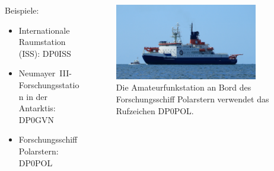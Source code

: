 \begin{frame}
\begin{columns}
    \begin{column}{0.48\textwidth}
    Beispiele:

\begin{itemize}
  \item Internationale Raumstation (ISS): DP0ISS
  \item Neumayer~III-Forschungsstation in der Antarktis: DP0GVN
  \item Forschungsschiff Polarstern: DP0POL
  \end{itemize}

    \end{column}
   \begin{column}{0.48\textwidth}
       
\begin{figure}
    \includegraphics[width=0.85\textwidth]{foto/125}
    \caption{\scriptsize Die Amateurfunkstation an Bord des Forschungsschiff Polarstern verwendet das Rufzeichen DP0POL.}
    \label{n_exterritoriale_stationen_polarstern}
\end{figure}

   \end{column}
\end{columns}

\end{frame}

